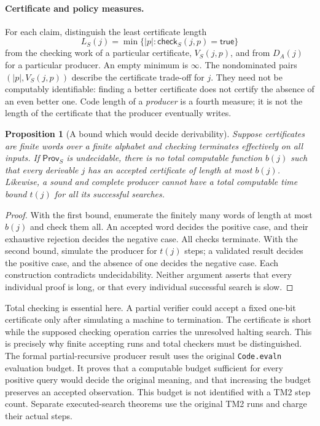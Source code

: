 \documentclass[11pt]{article}
\newtheorem{proposition}[definition]{Proposition}
\newcommand{\proofCheck}{\mathsf{check}}
\newcommand{\Prov}{\mathsf{Prov}}
\newcommand{\size}[1]{\lvert #1\rvert}
\newcommand{\code}[1]{\nolinkurl{#1}}
\begin{document}
\paragraph{Certificate and policy measures.}
For each claim, distinguish the least certificate length
\[
 L_S(j)=\min\{\size{p}:\proofCheck_S(j,p)=\mathsf{true}\}
\]
from the checking work of a particular certificate, $V_S(j,p)$, and
from $D_A(j)$ for a particular producer. An empty minimum is $\infty$.
The nondominated pairs $(\size{p},V_S(j,p))$ describe the certificate
trade-off for $j$. They need not be computably identifiable: finding a
better certificate does not certify the absence of an even better one.
Code length of a \emph{producer} is a fourth measure; it is not the length
of the certificate that the producer eventually writes.

\begin{proposition}[A bound which would decide derivability]
Suppose certificates are finite words over a finite alphabet and checking
terminates effectively on all inputs. If $\Prov_S$ is undecidable, there
is no total computable function $b(j)$ such that every derivable $j$
has an accepted certificate of length at most $b(j)$. Likewise, a sound
and complete producer cannot have a total computable time bound $t(j)$
for all its successful searches.
\end{proposition}
\begin{proof}
With the first bound, enumerate the finitely many words of length at
most $b(j)$ and check them all. An accepted word decides the positive
case, and their exhaustive rejection decides the negative case. All
checks terminate. With the second bound, simulate the producer for
$t(j)$ steps; a validated result decides the positive case, and the
absence of one decides the negative case. Each construction contradicts
undecidability. Neither argument asserts that every individual proof is
long, or that every individual successful search is slow.
\end{proof}
Total checking is essential here. A partial verifier could accept a
fixed one-bit certificate only after simulating a machine to termination.
The certificate is short while the supposed checking operation carries
the unresolved halting search. This is precisely why finite accepting
runs and total checkers must be distinguished.
The formal partial-recursive producer result uses the original
\code{Code.evaln} evaluation budget. It proves that a computable budget
sufficient for every positive query would decide the original meaning,
and that increasing the budget preserves an accepted observation. This
budget is not identified with a TM2 step count. Separate executed-search
theorems use the original TM2 runs and charge their actual steps.
\end{document}
